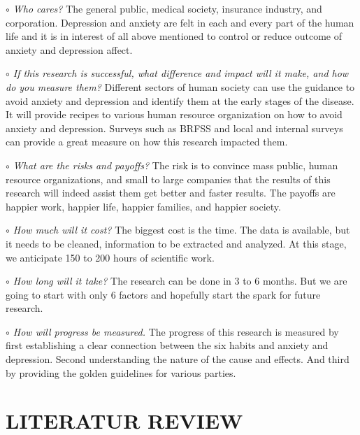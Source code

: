 \documentclass[letterpaper, 10 pt, conference]{ieeeconf}  %
\begin{document}
\par\noindent\textit{$\circ$ Who cares?}\newline
\textnormal{
The general public, medical society, insurance industry, and corporation. Depression 
and anxiety are felt in each and every part of the human life and it is in interest 
of all above mentioned to control or reduce outcome of anxiety and depression affect.
}
\par\noindent\textit{$\circ$ If this research is successful, what difference and impact will it make, and how do you measure them?}\newline
\textnormal{
Different sectors of 
human society can use the guidance to avoid anxiety and depression and identify them at the early 
stages of the disease. It will provide recipes to various human resource organization 
on how to avoid anxiety and depression. Surveys such as BRFSS and local and internal 
surveys can provide a great measure on how this research impacted them.
}
\par\noindent\textit{$\circ$ What are the risks and payoffs?}\newline
\textnormal{
The risk is to convince mass public, human resource organizations, and small 
to large companies that the results of this research will indeed assist them 
get better and faster results. The payoffs are happier work, happier life, 
happier families, and happier society.  
}
\par\noindent\textit{$\circ$ How much will it cost?}\newline
\textnormal{
The biggest cost is the time. The data is available, but it 
needs to be cleaned, information to be extracted and analyzed. 
At this stage, we anticipate 150 to 200 hours of scientific work. 
}
\par\noindent\textit{$\circ$ How long will it take?}\newline
\textnormal{
The research can be done in 3 to 6 months. But we are going to start
with only 6 factors and hopefully start the spark for future research. 
}
\par\noindent\textit{$\circ$ How will progress be measured.}\newline
\textnormal{
The progress of this research is measured by first establishing a clear connection 
between the six habits and anxiety and depression. Second understanding the nature of the cause and effects.
And third by providing the golden 
guidelines for various parties.
}

\setlength{\parskip}{.5em} %
\section{LITERATUR REVIEW}
\end{document}
